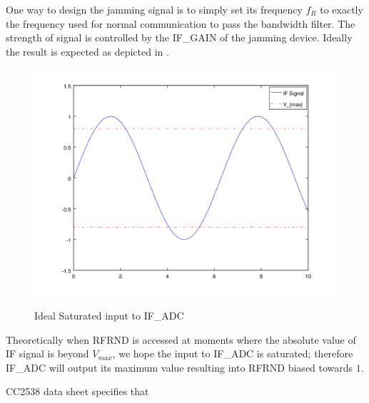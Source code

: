 One way to design the jamming signal is to simply set its frequency $f_{R}$ to exactly the frequency used for normal communication to pass the bandwidth filter. The strength of signal is controlled by the IF\_GAIN of the jamming device. Ideally the result is expected as depicted in .

\begin{figure}
\center
\caption{Ideal Saturated input to IF\_ADC}
\includegraphics[width=\textwidth]{figures/saturate.png}
\label{Saturate_ADC}
\end{figure}

Theoretically when RFRND is accessed at moments where the absolute value of IF signal is beyond $V_{max}$, we hope the input to IF\_ADC is saturated; therefore IF\_ADC will output its maximum value resulting into RFRND biased towards $1$.

CC2538 data sheet specifies that 
